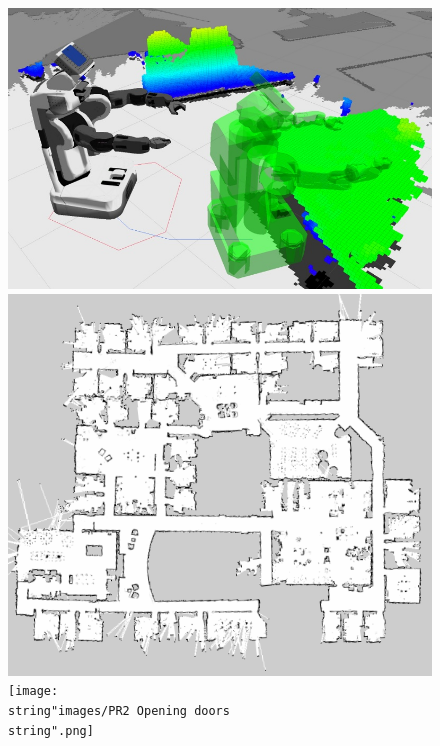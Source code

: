 \begin{minipage}[t]{0.5\paperwidth}%
\begin{figure}[H]
\noindent \centering{}\includegraphics[height=0.4\textheight]{images/PR2_3DNavigation}\\
\includegraphics[height=0.2\textheight]{images/2DMapping}\texttt{[image: \\string"images/PR2 Opening doors\\string".png]}
\end{figure}
%
\end{minipage}


\lyxframeend{}


